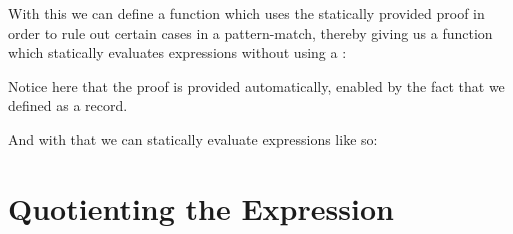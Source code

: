 With this we can define a function which uses the statically provided proof in
order to rule out certain cases in a pattern-match, thereby giving us a function
which statically evaluates expressions without using a :
\begin{agdalisting}
\end{agdalisting}
Notice here that the  proof is provided automatically,
enabled by the fact that we defined \agdatop as a record.

And with that we can statically evaluate expressions like so:
\begin{agdalisting}
\end{agdalisting}


\section{Quotienting the Expression}

